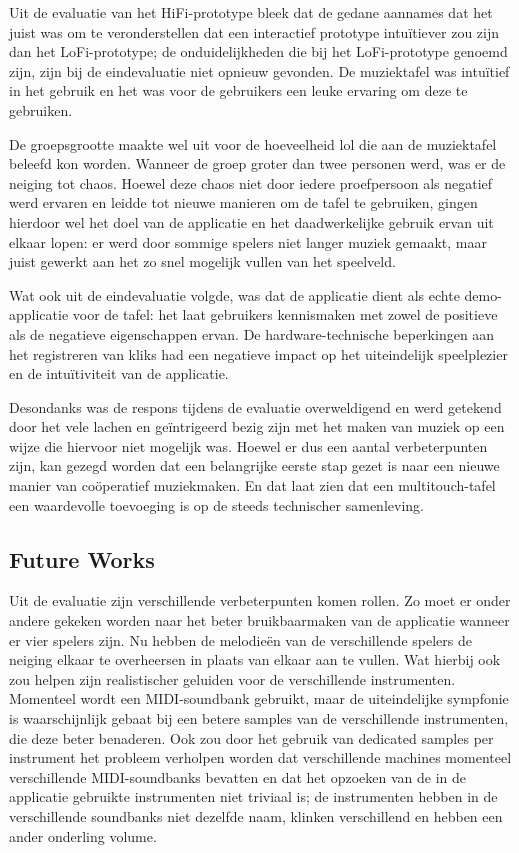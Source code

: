 \documentclass{acm}
\begin{document}
Uit de evaluatie van het HiFi-prototype bleek dat de gedane aannames dat het juist was om te veronderstellen dat een interactief prototype intuïtiever zou zijn dan het LoFi-prototype; de onduidelijkheden die bij het LoFi-prototype genoemd zijn, zijn bij de eindevaluatie niet opnieuw gevonden. De muziektafel was intuïtief in het gebruik en het was voor de gebruikers een leuke ervaring om deze te gebruiken.

De groepsgrootte maakte wel uit voor de hoeveelheid lol die aan de muziektafel beleefd kon worden. Wanneer de groep groter dan twee personen werd, was er de neiging tot chaos. Hoewel deze chaos niet door iedere proefpersoon als negatief werd ervaren en leidde tot nieuwe manieren om de tafel te gebruiken, gingen hierdoor wel het doel van de applicatie en het daadwerkelijke gebruik ervan uit elkaar lopen: er werd door sommige spelers niet langer muziek gemaakt, maar juist gewerkt aan het zo snel mogelijk vullen van het speelveld.

Wat ook uit de eindevaluatie volgde, was dat de applicatie dient als echte demo-applicatie voor de tafel: het laat gebruikers kennismaken met zowel de positieve als de negatieve eigenschappen ervan. De hardware-technische beperkingen aan het registreren van kliks had een negatieve impact op het uiteindelijk speelplezier en de intuïtiviteit van de applicatie.

Desondanks was de respons tijdens de evaluatie overweldigend en werd getekend door het vele lachen en geïntrigeerd bezig zijn met het maken van muziek op een wijze die hiervoor niet mogelijk was. Hoewel er dus een aantal verbeterpunten zijn, kan gezegd worden dat een belangrijke eerste stap gezet is naar een nieuwe manier van coöperatief muziekmaken. En dat laat zien dat een multitouch-tafel een waardevolle toevoeging is op de steeds technischer samenleving.

\subsection{Future Works}
Uit de evaluatie zijn verschillende verbeterpunten komen rollen. Zo moet er onder andere gekeken worden naar het beter bruikbaarmaken van de applicatie wanneer er vier spelers zijn. Nu hebben de melodieën van de verschillende spelers de neiging elkaar te overheersen in plaats van elkaar aan te vullen. Wat hierbij ook zou helpen zijn realistischer geluiden voor de verschillende instrumenten. Momenteel wordt een MIDI-soundbank gebruikt, maar de uiteindelijke sympfonie is waarschijnlijk gebaat bij een betere samples van de verschillende instrumenten, die deze beter benaderen. Ook zou door het gebruik van dedicated samples per instrument het probleem verholpen worden dat verschillende machines momenteel verschillende MIDI-soundbanks bevatten en dat het opzoeken van de in de applicatie gebruikte instrumenten niet triviaal is; de instrumenten hebben in de verschillende soundbanks niet dezelfde naam, klinken verschillend en hebben een ander onderling volume.
\end{document}
